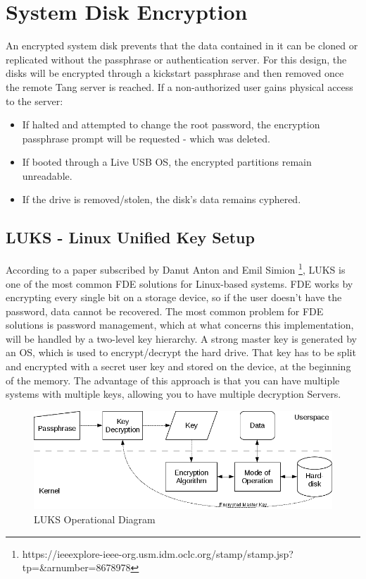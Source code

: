 \section{System Disk Encryption}
An encrypted system disk prevents that the data contained in it can be cloned or replicated without the passphrase or authentication server. For this design, the disks will be encrypted through a kickstart passphrase and then removed once the remote Tang server is reached. If a non-authorized user gains physical access to the server:
\begin{itemize}
  \item If halted and attempted to change the root password, the encryption passphrase prompt will be requested - which was deleted.
  \item If booted through a Live USB OS, the encrypted partitions remain unreadable.
  \item If the drive is removed/stolen, the disk's data remains cyphered.
\end{itemize}

\newpage
\subsection{LUKS - Linux Unified Key Setup}

According to a paper subscribed by Danut Anton and Emil Simion \footnote[1]{https://ieeexplore-ieee-org.usm.idm.oclc.org/stamp/stamp.jsp?tp=\&arnumber=8678978}, LUKS is one of the most common FDE solutions for Linux-based systems.
FDE works by encrypting every single bit on a storage device, so if the user doesn't have the password, data cannot be recovered. The most common problem for FDE solutions is password management, which at what concerns this implementation, will be handled by a two-level key hierarchy. A strong master key is generated by an OS, which is used to encrypt/decrypt the hard drive. That key has to be split and encrypted with a secret user key and stored on the device, at the beginning of the memory. The advantage of this approach is that you can have multiple systems with multiple keys, allowing you to have multiple decryption Servers.

\vskip 2cm
\begin{figure}
  \includegraphics[width=14cm]{images/image2.png}
  \centering
  \caption{LUKS Operational Diagram}
\end{figure}

